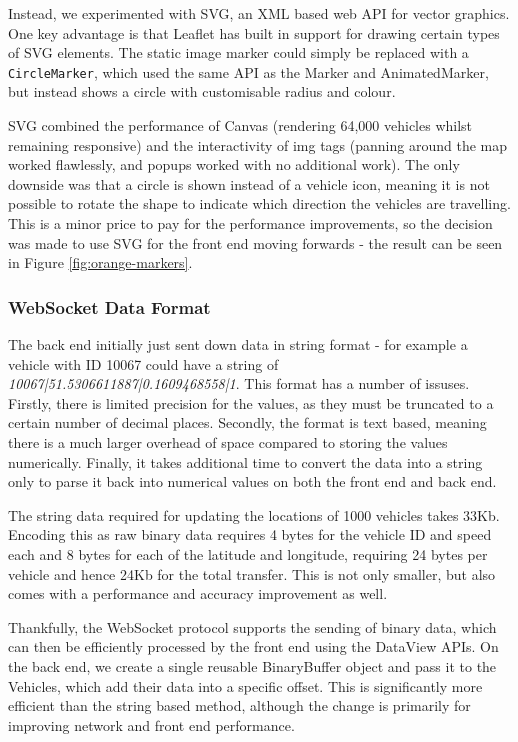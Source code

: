 \documentclass[ %
                    author={Alexander Hill},
                supervisor={Dr. Benjamin Sach},
                    degree={MEng},
                     title={MARMOSET},
                  subtitle={Multi-Agent Route Management using Online Simulation for Efficient Transportation},
                      type={research},
                      year={2016} ]{dissertation}
\begin{document}
Instead, we experimented with SVG, an XML based web API for vector graphics. One
key advantage is that Leaflet has built in support for drawing certain types of
SVG elements. The static image marker could simply be replaced with a
\texttt{CircleMarker}, which used the same API as the Marker and AnimatedMarker,
but instead shows a circle with customisable radius and colour.

SVG combined the performance of Canvas (rendering 64,000 vehicles whilst
remaining responsive) and the interactivity of img tags (panning around the map
worked flawlessly, and popups worked with no additional work). The only downside
was that a circle is shown instead of a vehicle icon, meaning it is not possible
to rotate the shape to indicate which direction the vehicles are travelling.
This is a minor price to pay for the performance improvements, so the decision
was made to use SVG for the front end moving forwards - the result can be seen
in Figure \ref{fig:orange-markers}.

\subsubsection{WebSocket Data Format}

The back end initially just sent down data in string format - for example a
vehicle with ID 10067 could have a string of
\textit{10067|51.5306611887|0.1609468558|1}. This format has a number of
issuses. Firstly, there is limited precision for the values, as they must be
truncated to a certain number of decimal places.  Secondly, the format is text
based, meaning there is a much larger overhead of space compared to storing the
values numerically. Finally, it takes additional time to convert the data into a
string only to parse it back into numerical values on both the front end and
back end.

The string data required for updating the locations of 1000 vehicles takes 33Kb.
Encoding this as raw binary data requires 4 bytes for the vehicle ID and speed
each and 8 bytes for each of the latitude and longitude, requiring 24 bytes per
vehicle and hence 24Kb for the total transfer.  This is not only smaller, but
also comes with a performance and accuracy improvement as well.

Thankfully, the WebSocket protocol supports the sending of binary data, which
can then be efficiently processed by the front end using the DataView APIs. On
the back end, we create a single reusable BinaryBuffer object and pass it to the
Vehicles, which add their data into a specific offset. This is significantly
more efficient than the string based method, although the change is primarily
for improving network and front end performance.
\end{document}

